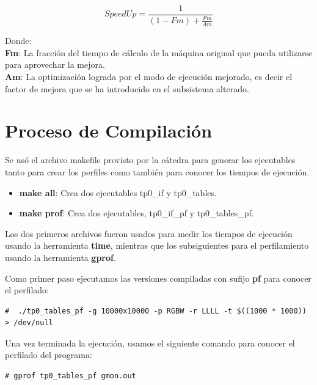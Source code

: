 \documentclass[a4paper, 10pt, twoside, notitlepage]{article}
\begin{document}
\begin{equation}
 SpeedUp =\frac{1}{(1-Fm) + \frac{Fm}{Am}}
\end{equation}

Donde:\\

\textbf{Fm}: La fracción del tiempo de cálculo de la máquina original que pueda utilizarse para aprovechar la mejora.\\

\textbf{Am}: La optimización lograda por el modo de ejecución mejorado, es decir el factor de mejora que se ha introducido en el subsistema alterado.


\newpage

\section{Proceso de Compilación}

Se usó el archivo makefile provisto por la cátedra para generar los ejecutables tanto para crear los perfiles como también para conocer los tiempos de ejecución.\\

\begin{itemize} 
\item[] \textbf{make all}: Crea dos ejecutables tp0\_if y tp0\_tables.
 \item[] \textbf{make prof}: Crea dos ejecutables, tp0\_if\_pf y tp0\_tables\_pf.
\end{itemize}

Los dos primeros archivos fueron usados para medir los tiempos de ejecución usando la herramienta \textbf{time}, mientras que los subsiguientes para el perfilamiento usando la herramienta \textbf{gprof}.

Como primer paso ejecutamos las versiones compiladas con sufijo \textbf{pf} para conocer el perfilado:
\scriptsize
\begin{verbatim}
#  ./tp0_tables_pf -g 10000x10000 -p RGBW -r LLLL -t $((1000 * 1000)) > /dev/null
\end{verbatim}
\normalsize

Una vez terminada la ejecución, usamos el siguiente comando para conocer el perfilado del programa:

\scriptsize
\begin{verbatim}
# gprof tp0_tables_pf gmon.out
\end{verbatim}
\normalsize
\end{document}
